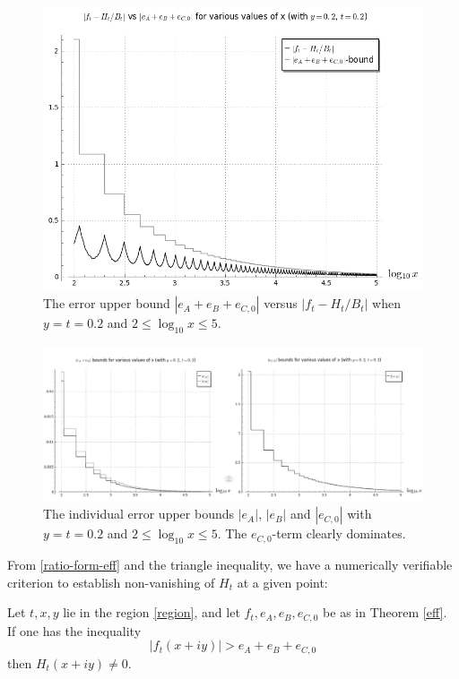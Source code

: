 \begin{figure}[h!]
  \includegraphics[width=0.8\linewidth]{ft_min_Ht_vs_errorterms.png}
  \caption{The error upper bound $|e_A+e_B+e_{C,0}|$ versus $|f_t - H_t/B_t|$ when $y=t=0.2$ and $2 \leq \log_{10} x \leq 5$.}
\label{errorboundtot}
\end{figure}

\begin{figure}[h!]
  \includegraphics[width=1.0\linewidth]{eA_eB_eC_errorbounds.png}
  \caption{The individual error upper bounds $|e_A|$, $|e_B|$ and $|e_{C,0}|$ with $y=t=0.2$ and $2 \leq \log_{10} x \leq 5$. The $e_{C,0}$-term clearly dominates.}
\label{ind_errorbounds}
\end{figure}

From \eqref{ratio-form-eff} and the triangle inequality, we have a numerically verifiable criterion to establish non-vanishing of $H_t$ at a given point:

\begin{corollary}\label{zero-test}  Let $t,x,y$ lie in the region \eqref{region}, and let $f_t, e_A, e_B, e_{C,0}$ be as in Theorem \ref{eff}.  If one has the inequality
\begin{equation}\label{criterion}
|f_t(x+iy)| > e_A + e_B + e_{C,0} 
\end{equation}
then $H_t(x+iy) \neq 0$.  
\end{corollary}

